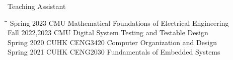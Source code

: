 
\begin{rSection}{Teaching Assistant}
\begin{tabbing}
    \hspace{2in}\= \hspace{1in}\= \kill
    Spring 2023 \> CMU  Mathematical Foundations of Electrical Engineering \\
   Fall 2022,2023  \>  CMU  Digital System Testing and Testable Design \\
Spring 2020  \> CUHK  \>  CENG3420 Computer Organization and Design \\
Spring 2021  \> CUHK  \>  CENG2030  Fundamentals of Embedded Systems
\end{tabbing}
\end{rSection}

